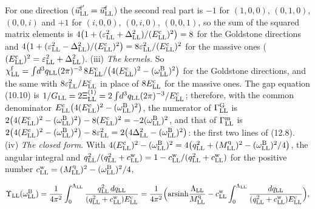 \documentclass[
  10pt,
]{article}
\begin{document}
For one direction (\(\vec u^{\rm f'}_{\rm LL}=\vec u^{\rm f}_{\rm LL}\))
the second real part is \(-1\) for \((1,0,0)\), \((0,1,0)\), \((0,0,i)\)
and \(+1\) for \((i,0,0)\), \((0,i,0)\), \((0,0,1)\), so the sum of the
squared matrix elements is
\(4\big(1+(\varepsilon_{\rm LL}^2+\Delta_{\rm LL}^2)/(E^{\rm c}_{\rm LL})^2\big)=8\)
for the Goldstone directions and
\(4\big(1+(\varepsilon_{\rm LL}^2-\Delta_{\rm LL}^2)/(E^{\rm c}_{\rm LL})^2\big)=8\varepsilon_{\rm LL}^2/(E^{\rm c}_{\rm LL})^2\)
for the massive ones
(\((E^{\rm c}_{\rm LL})^2=\varepsilon_{\rm LL}^2+\Delta_{\rm LL}^2\)).
(iii) \emph{The kernels.} So
\(\chi^{\rm f}_{\rm LL}=\int\!d^3q_{\rm LL}(2\pi)^{-3}\,8E^{\rm c}_{\rm LL}/\big(4(E^{\rm c}_{\rm LL})^2-(\omega^{\rm B}_{\rm LL})^2\big)\)
for the Goldstone directions, and the same with
\(8\varepsilon_{\rm LL}^2/E^{\rm c}_{\rm LL}\) in place of
\(8E^{\rm c}_{\rm LL}\) for the massive ones. The gap equation (10.10)
is
\(1/G_{\rm LL}=2\Xi^{(1)}_{\rm LL}=2\int\!d^3q_{\rm LL}(2\pi)^{-3}/E^{\rm c}_{\rm LL}\);
therefore, with the common denominator
\(E^{\rm c}_{\rm LL}\big(4(E^{\rm c}_{\rm LL})^2-(\omega^{\rm B}_{\rm LL})^2\big)\),
the numerator of \(\Gamma^{\rm G}_{\rm LL}\) is
\(2\big(4(E^{\rm c}_{\rm LL})^2-(\omega^{\rm B}_{\rm LL})^2\big)-8(E^{\rm c}_{\rm LL})^2=-2(\omega^{\rm B}_{\rm LL})^2\),
and that of \(\Gamma^{\rm m}_{\rm LL}\) is
\(2\big(4(E^{\rm c}_{\rm LL})^2-(\omega^{\rm B}_{\rm LL})^2\big)-8\varepsilon_{\rm LL}^2=2\big(4\Delta_{\rm LL}^2-(\omega^{\rm B}_{\rm LL})^2\big)\):
the first two lines of (12.8). (iv) \emph{The closed form.} With
\(4(E^{\rm c}_{\rm LL})^2-(\omega^{\rm B}_{\rm LL})^2=4\big(q_{\rm LL}^2+(M^{\rm q}_{\rm LL})^2-(\omega^{\rm B}_{\rm LL})^2/4\big)\),
the angular integral and
\(q_{\rm LL}^2/(q_{\rm LL}^2+c^{\rm w}_{\rm LL})=1-c^{\rm w}_{\rm LL}/(q_{\rm LL}^2+c^{\rm w}_{\rm LL})\)
for the positive number
\(c^{\rm w}_{\rm LL}=(M^{\rm q}_{\rm LL})^2-(\omega^{\rm B}_{\rm LL})^2/4\),

\[\Upsilon_{\rm LL}(\omega^{\rm B}_{\rm LL})=\frac1{4\pi^2}\int_0^{\Lambda_{\rm LL}}\frac{q_{\rm LL}^2\,dq_{\rm LL}}{(q_{\rm LL}^2+c^{\rm w}_{\rm LL})E^{\rm c}_{\rm LL}}=\frac1{4\pi^2}\Big(\mathrm{arsinh}\frac{\Lambda_{\rm LL}}{M^{\rm q}_{\rm LL}}-c^{\rm w}_{\rm LL}\int_0^{\Lambda_{\rm LL}}\frac{dq_{\rm LL}}{(q_{\rm LL}^2+c^{\rm w}_{\rm LL})E^{\rm c}_{\rm LL}}\Big),\]
\end{document}
